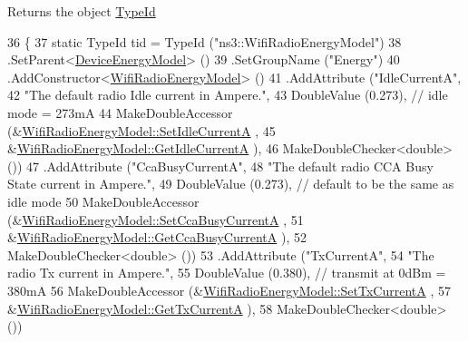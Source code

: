 \begin{DoxyReturn}{Returns}
the object \hyperlink{classns3_1_1TypeId}{Type\+Id} 
\end{DoxyReturn}

\begin{DoxyCode}
36 \{
37   \textcolor{keyword}{static} TypeId tid = TypeId (\textcolor{stringliteral}{"ns3::WifiRadioEnergyModel"})
38     .SetParent<\hyperlink{classns3_1_1DeviceEnergyModel_a29174f25707f14465081d80b555e3589}{DeviceEnergyModel}> ()
39     .SetGroupName (\textcolor{stringliteral}{"Energy"})
40     .AddConstructor<\hyperlink{classns3_1_1WifiRadioEnergyModel_a6b0e21d95458627bd77d2dc7cbed349b}{WifiRadioEnergyModel}> ()
41     .AddAttribute (\textcolor{stringliteral}{"IdleCurrentA"},
42                    \textcolor{stringliteral}{"The default radio Idle current in Ampere."},
43                    DoubleValue (0.273),  \textcolor{comment}{// idle mode = 273mA}
44                    MakeDoubleAccessor (&\hyperlink{classns3_1_1WifiRadioEnergyModel_ae369caec0e9b39a4f290b149b4efea9a}{WifiRadioEnergyModel::SetIdleCurrentA}
      ,
45                                        &\hyperlink{classns3_1_1WifiRadioEnergyModel_a50648b907f718a5dce9f3c390dcae9ca}{WifiRadioEnergyModel::GetIdleCurrentA}
      ),
46                    MakeDoubleChecker<double> ())
47     .AddAttribute (\textcolor{stringliteral}{"CcaBusyCurrentA"},
48                    \textcolor{stringliteral}{"The default radio CCA Busy State current in Ampere."},
49                    DoubleValue (0.273),  \textcolor{comment}{// default to be the same as idle mode}
50                    MakeDoubleAccessor (&\hyperlink{classns3_1_1WifiRadioEnergyModel_a410e1aaf4e722c5f6dd8950df79b5eae}{WifiRadioEnergyModel::SetCcaBusyCurrentA}
      ,
51                                        &\hyperlink{classns3_1_1WifiRadioEnergyModel_a3f4f6e6e4811c7d58b0175e5e7abf9f9}{WifiRadioEnergyModel::GetCcaBusyCurrentA}
      ),
52                    MakeDoubleChecker<double> ())
53     .AddAttribute (\textcolor{stringliteral}{"TxCurrentA"},
54                    \textcolor{stringliteral}{"The radio Tx current in Ampere."},
55                    DoubleValue (0.380),    \textcolor{comment}{// transmit at 0dBm = 380mA}
56                    MakeDoubleAccessor (&\hyperlink{classns3_1_1WifiRadioEnergyModel_a7c3e79aab7ec54d8cd39777d75288e69}{WifiRadioEnergyModel::SetTxCurrentA}
      ,
57                                        &\hyperlink{classns3_1_1WifiRadioEnergyModel_acd12496e021e0d8a096b61a6b2e5263c}{WifiRadioEnergyModel::GetTxCurrentA}
      ),
58                    MakeDoubleChecker<double> ())

\end{DoxyCode}
